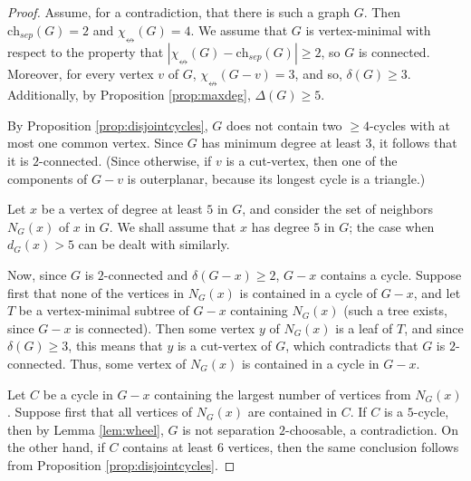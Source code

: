 \documentclass[10pt,a4paper]{amsart}
\newcommand{\ch}{\mathrm{ch}}
\newcommand{\single}{\chi_{\nleftrightarrow}}
\begin{document}
\begin{proof}
    Assume, for a contradiction, that there is such a graph $G$. 
    Then $\ch_{sep}(G)=2$
    and $\single(G) =4$. We assume that $G$ is vertex-minimal with 
    respect to the property that $|\single(G) - \ch_{sep}(G)| \geq 2$,
    so $G$ is connected. Moreover, for every vertex $v$ of $G$, 
    $\single(G-v)=3$, and so, $\delta(G) \geq 3$.
Additionally, 
    by Proposition \ref{prop:maxdeg}, $\Delta(G) \geq 5$.

By Proposition \ref{prop:disjointcycles},
$G$ does not contain two $\geq 4$-cycles with 
at most one common vertex. 
Since $G$ has minimum degree at least $3$, it follows that it 
is $2$-connected. (Since otherwise, if $v$ is a cut-vertex, then one of 
the components of $G-v$ is outerplanar, because its longest cycle is a 
triangle.)




Let $x$ be a vertex of degree at least $5$ in $G$, and consider the set 
of neighbors $N_G(x)$ of $x$ in $G$. We shall assume that $x$ has
degree $5$ in $G$; the case when $d_G(x) > 5$ can be dealt with 
similarly.


Now, since $G$ is $2$-connected and $\delta(G-x) \geq 2$,
$G-x$ contains a cycle. Suppose first that none of the vertices
in $N_G(x)$ is contained in a cycle of $G-x$, and let $T$ be a 
vertex-minimal subtree of $G-x$ containing $N_G(x)$ (such a tree exists,
since $G-x$ is connected). Then some vertex $y$ of $N_G(x)$ is a leaf of 
$T$, and since $\delta(G) \geq 3$, this means that $y$ is a cut-vertex 
of $G$, which contradicts that $G$ is $2$-connected. 
Thus, some vertex of $N_G(x)$ is contained in a cycle in $G-x$.

Let $C$ be a cycle in $G-x$ containing the largest number of vertices
from $N_G(x)$. 
Suppose first that all vertices of $N_G(x)$ are contained in $C$.
If $C$ is a $5$-cycle, then by Lemma \ref{lem:wheel}, 
$G$ is not separation
$2$-choosable, a contradiction. On the other hand, if $C$ contains at least $6$ vertices,
then the same conclusion follows from Proposition \ref{prop:disjointcycles}.


\end{proof}
\end{document}
